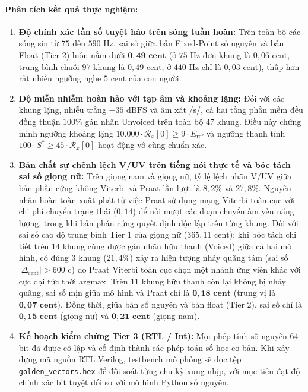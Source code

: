 \documentclass[11pt,a4paper]{article}
\begin{document}
\paragraph{Phân tích kết quả thực nghiệm:}
\begin{enumerate}
    \setlength{\itemsep}{1.5pt}
    \item \textbf{Độ chính xác tần số tuyệt hảo trên sóng tuần hoàn:} Trên toàn bộ các sóng sin từ $75$ đến $590\text{ Hz}$, sai số giữa bản Fixed-Point số nguyên và bản Float (Tier 2) luôn nằm dưới $\mathbf{0{,}49\text{ cent}}$ (ở $75\text{ Hz}$ đơn khung là $0{,}06\text{ cent}$, trung bình chuỗi $97\text{ khung}$ là $0{,}49\text{ cent}$; ở $440\text{ Hz}$ chỉ là $0{,}03\text{ cent}$), thấp hơn rất nhiều ngưỡng nghe $5\text{ cent}$ của con người.
    \item \textbf{Độ miễn nhiễm hoàn hảo với tạp âm và khoảng lặng:} Đối với các khung lặng, nhiễu trắng $-35\text{ dBFS}$ và âm xát /s/, cả hai tầng phần mềm đều đồng thuận $100\%$ gán nhãn Unvoiced trên toàn bộ 47 khung. Điều này chứng minh ngưỡng khoảng lặng $10.000 \cdot \mathcal{R}_x[0] \ge 9 \cdot E_{\text{ref}}$ và ngưỡng thanh tính $100 \cdot S^* \ge 45 \cdot \mathcal{R}_x[0]$ hoạt động vô cùng chuẩn xác.
    \item \textbf{Bản chất sự chênh lệch V/UV trên tiếng nói thực tế và bóc tách sai số giọng nữ:} Trên giọng nam và giọng nữ, tỷ lệ lệch nhãn V/UV giữa bản phần cứng không Viterbi và Praat lần lượt là $8{,}2\%$ và $27{,}8\%$. Nguyên nhân hoàn toàn xuất phát từ việc Praat sử dụng mạng Viterbi toàn cục với chi phí chuyển trạng thái ($0{,}14$) để nối mượt các đoạn chuyển âm yếu năng lượng, trong khi bản phần cứng quyết định độc lập trên từng khung.
    Đối với sai số cao độ trung bình Tier 1 của giọng nữ ($365{,}11\text{ cent}$): khi bóc tách chi tiết trên $14$ khung cùng được gán nhãn hữu thanh (Voiced) giữa cả hai mô hình, có đúng $3$ khung ($21{,}4\%$) xảy ra hiện tượng nhảy quãng tám (sai số $|\Delta_{\text{cent}}| > 600\text{ c}$) do Praat Viterbi toàn cục chọn một nhánh ứng viên khác với cực đại tức thời $\text{argmax}$. Trên $11$ khung hữu thanh còn lại không bị nhảy quãng, sai số mịn giữa mô hình và Praat chỉ là $\mathbf{0{,}18\text{ cent}}$ (trung vị là $\mathbf{0{,}07\text{ cent}}$). Đồng thời, giữa bản số nguyên và bản float (Tier 2), sai số chỉ là $\mathbf{0{,}15\text{ cent}}$ (giọng nữ) và $\mathbf{0{,}21\text{ cent}}$ (giọng nam).
    \item \textbf{Kế hoạch kiểm chứng Tier 3 (RTL / Int):} Mọi phép tính số nguyên 64-bit đã được cô lập và cố định thành các phép toán số học cơ bản. Khi xây dựng mã nguồn RTL Verilog, testbench mô phỏng sẽ đọc tệp \texttt{golden\_vectors.hex} để đối soát từng chu kỳ xung nhịp, với mục tiêu đạt độ chính xác bit tuyệt đối so với mô hình Python số nguyên.
\end{enumerate}
\end{document}
